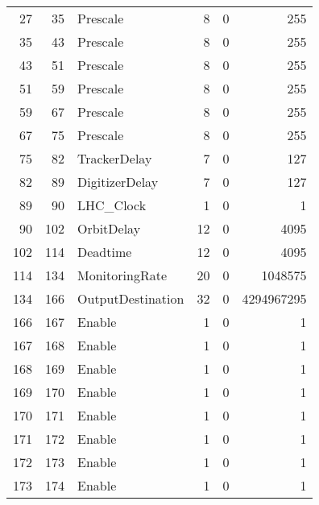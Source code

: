 \begin{table}[htbp]
\begin{tabular}{rrlrrr}
    27    & 35    & Prescale & 8     & 0     & 255 \\
    35    & 43    & Prescale & 8     & 0     & 255 \\
    43    & 51    & Prescale & 8     & 0     & 255 \\
    51    & 59    & Prescale & 8     & 0     & 255 \\
    59    & 67    & Prescale & 8     & 0     & 255 \\
    67    & 75    & Prescale & 8     & 0     & 255 \\
    75    & 82    & TrackerDelay & 7     & 0     & 127 \\
    82    & 89    & DigitizerDelay & 7     & 0     & 127 \\
    89    & 90    & LHC\_Clock & 1     & 0     & 1 \\
    90    & 102   & OrbitDelay & 12    & 0     & 4095 \\
    102   & 114   & Deadtime & 12    & 0     & 4095 \\
    114   & 134   & MonitoringRate & 20    & 0     & 1048575 \\
    134   & 166   & OutputDestination & 32    & 0     & 4294967295 \\
    166   & 167   & Enable & 1     & 0     & 1 \\
    167   & 168   & Enable & 1     & 0     & 1 \\
    168   & 169   & Enable & 1     & 0     & 1 \\
    169   & 170   & Enable & 1     & 0     & 1 \\
    170   & 171   & Enable & 1     & 0     & 1 \\
    171   & 172   & Enable & 1     & 0     & 1 \\
    172   & 173   & Enable & 1     & 0     & 1 \\
    173   & 174   & Enable & 1     & 0     & 1 \\
    \end{tabular}%
  \label{tab:VariableLayoutTLBConfigurationFULL}%
\end{table}%